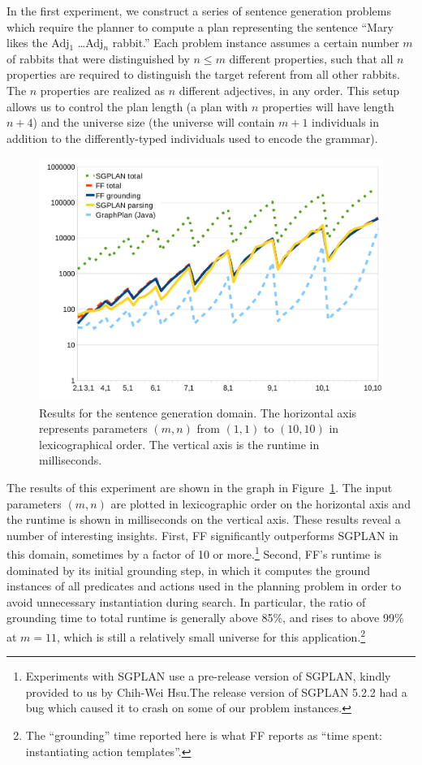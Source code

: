 In the first experiment, we construct a series of sentence generation
problems which require the planner to compute a plan representing the
sentence ``Mary likes the Adj$_1$ \ldots Adj$_n$ rabbit.''  Each problem
instance assumes a certain number $m$ of rabbits that were distinguished by
$n \leq m$ different properties, such that all $n$ properties are required
to distinguish the target referent from all other rabbits.  The $n$
properties are realized as $n$ different adjectives, in any order.  This
setup allows us to control the plan length (a plan with $n$ properties will
have length $n+4$) and the universe size (the universe will contain $m+1$
individuals in addition to the differently-typed individuals used to encode
the grammar).

\begin{figure}
  \centering
  \includegraphics[width=0.75\columnwidth]{graph-exp1}
  \caption{Results for the sentence generation domain. The
    horizontal axis represents parameters $(m,n)$ from $(1,1)$ to
    $(10,10)$ in lexicographical order. The vertical axis is the
    runtime in milliseconds.}
  \label{fig:runtimes-crisp}
\end{figure}

The results of this experiment are shown in the graph in
Figure~\ref{fig:runtimes-crisp}. The input parameters $(m,n)$ are plotted
in lexicographic order on the horizontal axis and the runtime is shown in
milliseconds on the vertical axis. These results reveal a number of
interesting insights. First, FF significantly outperforms SGPLAN in this
domain, sometimes by a factor of 10 or more.\footnote{Experiments with
 SGPLAN use a pre-release version of SGPLAN, kindly provided to us by
 Chih-Wei Hsu.The release version of SGPLAN 5.2.2 had a bug which caused it
 to crash on some of our problem instances.}
Second, FF's runtime is dominated by its initial grounding step, in which
it computes the ground instances of all predicates and actions used in the
planning problem in order to avoid unnecessary instantiation during search.
In particular, the ratio of grounding time to total runtime is generally
above 85\%, and rises to above 99\% at $m=11$, which is still a relatively
small universe for this application.\footnote{The
  ``grounding'' time reported here is what FF reports as ``time spent:
  instantiating action templates''.} 

